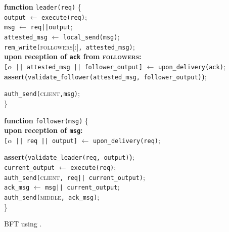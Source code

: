 \begin{algorithm}
\SetAlgoLined
\small
\textbf{function} \texttt{leader(req)} \{ \\
\Indp
 {\tt output} $\leftarrow$ \texttt{execute(req)};\\
 {\tt msg} $\leftarrow$ \texttt{req||output};\\
 {\tt attested\_msg} $\leftarrow$ \texttt{local\_send(msg)};\\
 \texttt{rem\_write(}\textsc{followers[:]}{\tt, attested\_msg)};\\

{\bf upon reception of {\tt ack} from \textsc{followers}:}\\
    \Indp
        {\tt [{$\alpha$ || attested\_msg || follower\_output}]} $\leftarrow$ \texttt{upon\_delivery(ack)};\\
        {\bf assert(}\texttt{validate\_follower(attested\_msg, follower\_output)}{\bf)};\\
    \Indm

 \texttt{auth\_send(}\textsc{client}{\tt,msg)};\\
\Indm
\} \\

\vspace{0.15cm}

\textbf{function} \texttt{follower(msg)} \{ \\
\Indp
{\bf upon reception of {\tt msg}:}\\
    \Indp
        {\tt [{$\alpha$ || req || output}]} $\leftarrow$ \texttt{upon\_delivery(req)};\\
    \Indm

    {\bf assert(}\texttt{validate\_leader(req, output)}{\bf)};\\
    {\tt current\_output} $\leftarrow$ \texttt{execute(req)};\\
    
    \texttt{auth\_send(}\textsc{client}{\tt, req|| current\_output)};\\
    {\tt ack\_msg} $\leftarrow$ \texttt{msg|| current\_output};\\
    \texttt{auth\_send(}\textsc{middle}{\tt, ack\_msg)};\\
\Indm
\} \\
\vspace{-1pt}
\caption{BFT using \projecttitle{}.}
\label{algo:tnic_bft}
\end{algorithm}

%



